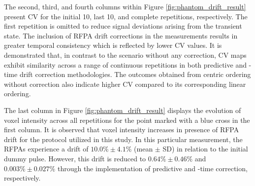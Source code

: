 The second, third, and fourth columns within Figure \ref{fig:phantom_drift_result} present CV for the initial 10, last 10, and complete repetitions, respectively.  The first repetition is omitted to reduce signal deviations arising from the transient state. The inclusion of RFPA drift corrections in the measurements results in greater temporal consistency which is reflected by lower CV values. It is demonstrated that, in contrast to the scenario without any correction, CV maps exhibit similarity across a range of continuous repetitions in both predictive and -time drift correction methodologies. The outcomes obtained from centric ordering without correction also indicate higher CV compared to its corresponding linear ordering.

The last column in Figure \ref{fig:phantom_drift_result} displays the evolution of voxel intensity across all repetitions for the point marked with a blue cross in the first column. It is observed that voxel intensity increases in presence of RFPA drift for the protocol utilized in this study. In this particular measurement, the RFPAs experience a drift of $10.0\%\pm4.1\%$ (mean $\pm$ SD) in relation to the initial dummy pulse. However, this drift is reduced to $0.64\%\pm0.46\%$ and $0.003\%\pm0.027\%$ through the implementation of predictive and -time correction, respectively.

